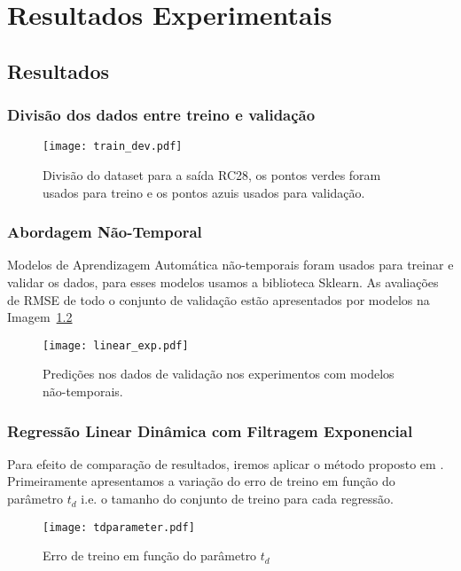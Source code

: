 \chapter{Resultados Experimentais }
\label{cap:resultados}

\section{Resultados}



\subsection{Divisão dos dados entre treino e validação}

\begin{figure}[H]
  \centering
  \texttt{[image: train\_dev.pdf]}
  \caption{Divisão do dataset para a saída RC28, os pontos verdes foram usados para
    treino e os pontos azuis usados para validação.}
  \label{fig:divrc28}
\end{figure}

\subsection{Abordagem Não-Temporal}

Modelos de Aprendizagem Automática não-temporais foram usados para treinar e validar os dados, para esses modelos usamos a biblioteca Sklearn.
As avaliações de RMSE de todo o conjunto de validação estão apresentados por modelos na Imagem~\ref{fig:linmodels}  

\begin{figure}[H]
  \centering
  \label{fig:linmodels}
\texttt{[image: linear\_exp.pdf]}
\caption{Predições nos dados de validação nos experimentos com modelos não-temporais. }
\end{figure}

\subsection{Regressão Linear Dinâmica com Filtragem Exponencial}

Para efeito de comparação de resultados, iremos aplicar o método proposto em
\citep{grecialin}. Primeiramente apresentamos a variação do erro de treino em
função do parâmetro $t_d$ i.e. o tamanho do conjunto de treino para cada
regressão.

\begin{figure}[H]
  \centering
  \texttt{[image: tdparameter.pdf]}
  \caption{Erro de treino em função do parâmetro $t_d$}
  \label{fig:tdparam}
\end{figure}

